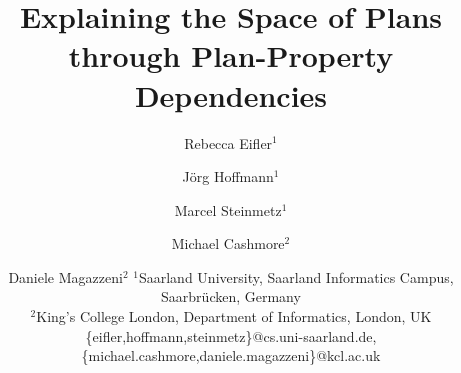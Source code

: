 \documentclass{article}
\begin{document}
\title{Explaining the Space of Plans through Plan-Property Dependencies}

\author{
Rebecca Eifler$^1$\and
J\"org Hoffmann$^1$\and
Marcel Steinmetz$^1$\and
Michael Cashmore$^2$\and
Daniele Magazzeni$^2$
\affiliations
$^1$Saarland University, Saarland Informatics Campus, Saarbr\"ucken, Germany\\
$^2$King's College London, Department of Informatics, London, UK\\
\emails
\{eifler,hoffmann,steinmetz\}@cs.uni-saarland.de,
\{michael.cashmore,daniele.magazzeni\}@kcl.ac.uk 
}
%

\maketitle
\end{document}
